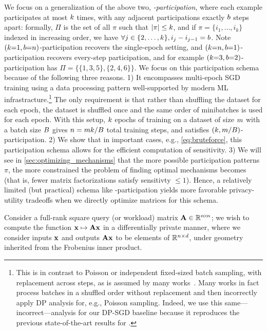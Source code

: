 \documentclass{article} %
\theoremstyle{named}
\begin{document}
  We focus on a generalization of the above two, \emph{\multiepoch-participation}, where each example participates at most $k$ times, with any adjacent participations exactly $b$ steps apart: formally, $\Pi$ is the set of all $\pi$ such that $|\pi| \le k$, and if $\pi = \{i_1, \dots, i_k\}$ indexed in increasing order, we have $\forall j \in \{2, \dots, k\}, i_j - i_{j-1} = b$. Note $(k{=}1, b{=}n)$-participation recovers the single-epoch setting, and $(k{=}n, b{=}1)$-participation recovers every-step participation, and for example $(k{=}3, b{=}2)$-participation has $\Pi = \{\{1, 3, 5\}, \{2, 4, 6\}\}$. We focus on this participation schema because of the following three reasons.
1) It encompasses multi-epoch SGD training using a data processing pattern well-supported by modern ML infrastracture.\footnote{This is in contrast to Poisson or independent fixed-sized batch sampling, with replacement across steps, as is assumed by many works~\citep{abadi2016deep,BST14,zhu2019poission,WangBK19}. Many works in fact process batches in a shuffled order without replacement and then incorrectly apply DP analysis for, e.g., Poisson sampling. Indeed, we use this same---incorrect---analysis for our DP-SGD baseline because it reproduces the previous state-of-the-art results for \DPSGD.} The only requirement is that rather than shuffling the dataset for each epoch, the dataset is shuffled once and the same order of minibatches is used for each epoch. With this setup, $k$ epochs of training on a dataset of size $m$ with a batch size $B$ gives $n = m k / B$ total training steps, and satisfies $(k, m/B)$-participation.     
2) We show that in important cases, e.g., \cref{eq:bruteforce}, this participation schema allows for the efficient computation of sensitivity.
3) We will see in \cref{sec:optimizing_mechanisms} that the more possible participation patterns $\pi$, the more constrained the problem of finding optimal mechanisms becomes (that is, fewer matrix factorizations satisfy sensitivty $\le 1$). Hence, a relatively limited (but practical) schema like \multiepoch-participation yields more favorable privacy-utility tradeoffs when we directly optimize matrices for this schema.


Consider a full-rank square query (or workload) matrix $\mathbf{A} \in \mathbb{R}^{{n\!\times\!n}}$; we wish to compute the function $\mathbf{x} \mapsto \mathbf{A}\mathbf{x}$ in a differentially private manner, where we consider inputs $\mathbf{x}$ and outputs $\mathbf{A}\mathbf{x}$ to be elements of $\mathbb{R}^{n\times d}$, under geometry inherited from the Frobenius inner product.
\end{document}
